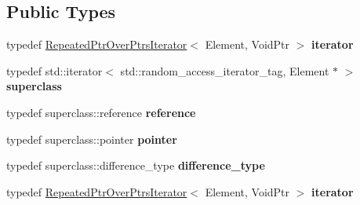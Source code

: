 \subsection*{Public Types}
\begin{DoxyCompactItemize}
\item 
\mbox{\label{classgoogle_1_1protobuf_1_1internal_1_1RepeatedPtrOverPtrsIterator_a9dc6db96b8243647e6629a2cc1c8e997}} 
typedef \hyperlink{classgoogle_1_1protobuf_1_1internal_1_1RepeatedPtrOverPtrsIterator}{Repeated\+Ptr\+Over\+Ptrs\+Iterator}$<$ Element, Void\+Ptr $>$ {\bfseries iterator}
\item 
\mbox{\label{classgoogle_1_1protobuf_1_1internal_1_1RepeatedPtrOverPtrsIterator_a72b01a022de6d027eaba94ae9eb40041}} 
typedef std\+::iterator$<$ std\+::random\+\_\+access\+\_\+iterator\+\_\+tag, Element $\ast$ $>$ {\bfseries superclass}
\item 
\mbox{\label{classgoogle_1_1protobuf_1_1internal_1_1RepeatedPtrOverPtrsIterator_a14425e468d4241a813f24d107ac11981}} 
typedef superclass\+::reference {\bfseries reference}
\item 
\mbox{\label{classgoogle_1_1protobuf_1_1internal_1_1RepeatedPtrOverPtrsIterator_a7f163a78af00c504f749d249ec7b63c0}} 
typedef superclass\+::pointer {\bfseries pointer}
\item 
\mbox{\label{classgoogle_1_1protobuf_1_1internal_1_1RepeatedPtrOverPtrsIterator_aa6b567da95f7d74a2969a954810aac3a}} 
typedef superclass\+::difference\+\_\+type {\bfseries difference\+\_\+type}
\item 
\mbox{\label{classgoogle_1_1protobuf_1_1internal_1_1RepeatedPtrOverPtrsIterator_a9dc6db96b8243647e6629a2cc1c8e997}} 
typedef \hyperlink{classgoogle_1_1protobuf_1_1internal_1_1RepeatedPtrOverPtrsIterator}{Repeated\+Ptr\+Over\+Ptrs\+Iterator}$<$ Element, Void\+Ptr $>$ {\bfseries iterator}
\item 

\end{DoxyCompactItemize}

